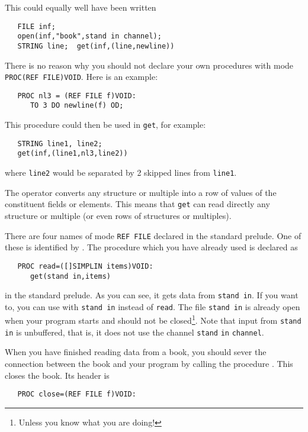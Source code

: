 \noindent
This could equally well have been written
\begin{verbatim}
   FILE inf;
   open(inf,"book",stand in channel);
   STRING line;  get(inf,(line,newline))
\end{verbatim}
\noindent
There is no reason why you should not declare your own procedures
with mode \verb|PROC(REF FILE)VOID|. Here is an example:
\begin{verbatim}
   PROC nl3 = (REF FILE f)VOID:
      TO 3 DO newline(f) OD;
\end{verbatim}
\noindent
This procedure could then be used in \verb|get|, for example:
\begin{verbatim}
   STRING line1, line2;
   get(inf,(line1,nl3,line2))
\end{verbatim}
\noindent
where \verb|line2| would be separated by 2 skipped lines from
\verb|line1|.

The  operator converts any
structure or multiple into a row of values of the constituent fields
or elements. This means that \verb|get| can read directly any
structure or multiple (or even rows of structures or multiples).

There are four names of mode \verb|REF FILE| declared in the standard
prelude. One of these is identified by . The procedure
 which you have already used is declared as
\begin{verbatim}
   PROC read=([]SIMPLIN items)VOID:
      get(stand in,items)
\end{verbatim}
\noindent
in the standard prelude. As you can see, it gets data from
\verb|stand in|. If you want to, you can use  with
\verb|stand in| instead of \verb|read|. The file \verb|stand in| is
already open when your program starts and should not be
closed\footnote{Unless you know what you are doing!}. Note that input
from \verb|stand in| is unbuffered, that is, it does not use the
channel \verb|stand| \verb|in| \verb|channel|.

When you have finished reading data from a book, you should sever the
connection between the book and your program by calling the procedure
. This closes the book. Its header is
\begin{verbatim}
   PROC close=(REF FILE f)VOID:
\end{verbatim}

